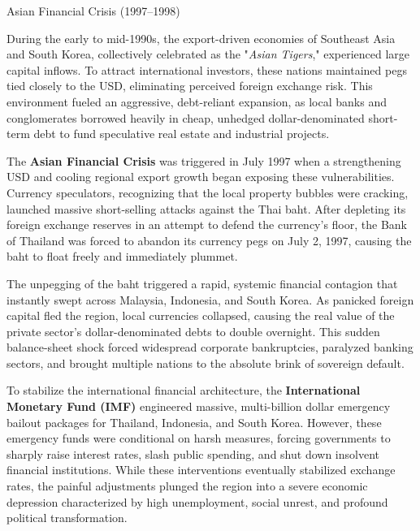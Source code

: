 \documentclass[10pt]{article}
\begin{document}
    \begin{core}[label=core:afc]{Asian Financial Crisis (1997--1998)}

      During the early to mid-1990s, the export-driven economies of Southeast Asia and South Korea, collectively celebrated as the "\textit{Asian Tigers}," experienced large capital inflows. To attract international investors, these nations maintained pegs tied closely to the USD, eliminating perceived foreign exchange risk. This environment fueled an aggressive, debt-reliant expansion, as local banks and conglomerates borrowed heavily in cheap, unhedged dollar-denominated short-term debt to fund speculative real estate and industrial projects.

      The \textbf{Asian Financial Crisis} was triggered in July 1997 when a strengthening USD and cooling regional export growth began exposing these vulnerabilities. Currency speculators, recognizing that the local property bubbles were cracking, launched massive short-selling attacks against the Thai baht. After depleting its foreign exchange reserves in an attempt to defend the currency's floor, the Bank of Thailand was forced to abandon its currency pegs on July 2, 1997, causing the baht to float freely and immediately plummet.

      The unpegging of the baht triggered a rapid, systemic financial contagion that instantly swept across Malaysia, Indonesia, and South Korea. As panicked foreign capital fled the region, local currencies collapsed, causing the real value of the private sector's dollar-denominated debts to double overnight. This sudden balance-sheet shock forced widespread corporate bankruptcies, paralyzed banking sectors, and brought multiple nations to the absolute brink of sovereign default.


      To stabilize the international financial architecture, the \textbf{International Monetary Fund (IMF)} engineered massive, multi-billion dollar emergency bailout packages for Thailand, Indonesia, and South Korea. However, these emergency funds were conditional on harsh measures, forcing governments to sharply raise interest rates, slash public spending, and shut down insolvent financial institutions. While these interventions eventually stabilized exchange rates, the painful adjustments plunged the region into a severe economic depression characterized by high unemployment, social unrest, and profound political transformation.

    \end{core}
\end{document}
